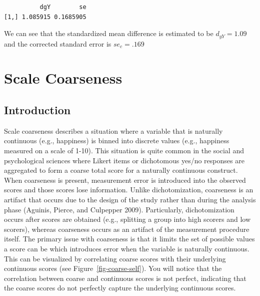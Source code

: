 \documentclass[
  letterpaper,
  DIV=11,
  numbers=noendperiod]{scrreprt}
\newenvironment{Shaded}{}{}
\newcommand{\CommentTok}[1]{\textcolor[rgb]{0.54,0.53,0.53}{#1}}
\newcommand{\FloatTok}[1]{\textcolor[rgb]{0.69,0.50,0.00}{#1}}
\newcommand{\FunctionTok}[1]{\textcolor[rgb]{0.39,0.29,0.61}{#1}}
\newcommand{\NormalTok}[1]{\textcolor[rgb]{0.12,0.11,0.11}{#1}}
\newcommand{\OtherTok}[1]{\textcolor[rgb]{0.00,0.43,0.16}{#1}}
\newcommand{\SpecialCharTok}[1]{\textcolor[rgb]{0.24,0.68,0.91}{#1}}
\begin{document}
\begin{tcolorbox}
\begin{Shaded}
\end{Shaded}

\begin{verbatim}
          dgY        se
[1,] 1.085915 0.1685905
\end{verbatim}

We can see that the standardized mean difference is estimated to be
\(d_{gY}=1.09\) and the corrected standard error is \(se_c=.169\)

\end{tcolorbox}

\hypertarget{scale-coarseness}{%
\chapter{Scale Coarseness}\label{scale-coarseness}}

\hypertarget{introduction-4}{%
\section{Introduction}\label{introduction-4}}

Scale coarseness describes a situation where a variable that is
naturally continuous (e.g., happiness) is binned into discrete values
(e.g., happiness measured on a scale of 1-10). This situation is quite
common in the social and psychological sciences where Likert items or
dichotomous yes/no responses are aggregated to form a coarse total score
for a naturally continuous construct. When coarseness is present,
measurement error is introduced into the observed scores and those
scores lose information. Unlike dichotomization, coarseness is an
artifact that occurs due to the design of the study rather than during
the analysis phase (Aguinis, Pierce, and Culpepper 2009). Particularly,
dichotomization occurs after scores are obtained (e.g., splitting a
group into high scorers and low scorers), whereas coarseness occurs as
an artifact of the measurement procedure itself. The primary issue with
coarseness is that it limits the set of possible values a score can be
which introduces error when the variable is naturally continuous. This
can be visualized by correlating coarse scores with their underlying
continuous scores (see Figure~\ref{fig-coarse-self}). You will notice
that the correlation between coarse and continuous scores is not
perfect, indicating that the coarse scores do not perfectly capture the
underlying continuous scores.
\end{document}
